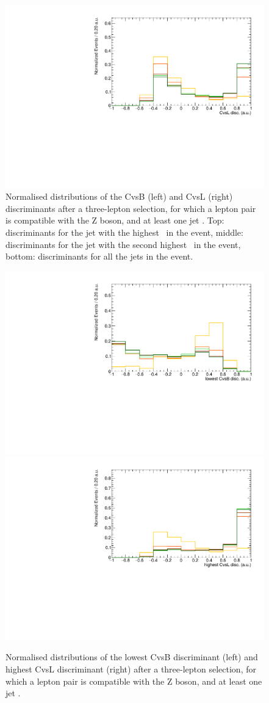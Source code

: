 \begin{figure}[htbp]
	\includegraphics[width=0.49\linewidth]{7_Conclusion/Figures/charmtagging/3lepcontrol_dilep_CvsLdisc_all_Normalized}
		\caption{Normalised distributions of the CvsB (left) and CvsL (right) discriminants after a three-lepton selection, for which a lepton pair is compatible with the Z boson, and at least one jet . Top: discriminants for the jet with the highest \pt\ in the event, middle: discriminants for the jet with the second highest \pt\ in the event, bottom: discriminants for all the jets in the event.   }
	\label{fig:ctagging1}
\end{figure}

\begin{figure}[htbp]  %
	\includegraphics[width=0.49\linewidth]{7_Conclusion/Figures/charmtagging/3lepcontrol_dilep_CvsBdiscLow_all_Normalized}
	\includegraphics[width=0.49\linewidth]{7_Conclusion/Figures/charmtagging/3lepcontrol_dilep_CvsLdiscHigh_all_Normalized}
	
	\caption{Normalised distributions of the lowest CvsB discriminant (left) and highest CvsL discriminant (right) after a three-lepton selection, for which a lepton pair is compatible with the Z boson, and at least one jet .}
	\label{fig:ctagging}
\end{figure}

